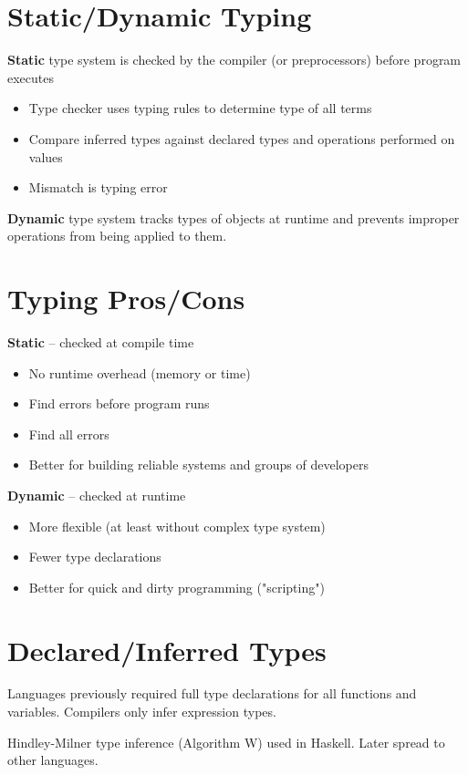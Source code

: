 \documentclass[11pt]{article}
\begin{document}
\section*{Static/Dynamic Typing}

\textbf{Static} type system is checked by the compiler (or preprocessors) before program executes
\begin{itemize}
	\item Type checker uses typing rules to determine type of all terms
	\item Compare inferred types against declared types and operations performed on values
	\item Mismatch is typing error
\end{itemize}

\textbf{Dynamic} type system tracks types of objects at runtime and prevents improper operations from being applied to them.

\section*{Typing Pros/Cons}

\textbf{Static} -- checked at compile time
\begin{itemize}
	\item No runtime overhead (memory or time)
	\item Find errors before program runs
	\item Find all errors
	\item Better for building reliable systems and groups of developers
\end{itemize}

\textbf{Dynamic} -- checked at runtime
\begin{itemize}
	\item More flexible (at least without complex type system)
	\item Fewer type declarations
	\item Better for quick and dirty programming ("scripting")
\end{itemize}

\section*{Declared/Inferred Types}

Languages previously required full type declarations for all functions and variables. Compilers only infer expression types.

Hindley-Milner type inference (Algorithm W) used in Haskell. 
Later spread to other languages.
\end{document}
